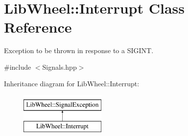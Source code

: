 \hypertarget{classLibWheel_1_1Interrupt}{
\section{\-Lib\-Wheel\-:\-:\-Interrupt \-Class \-Reference}
\label{classLibWheel_1_1Interrupt}
}


\-Exception to be thrown in response to a \-S\-I\-G\-I\-N\-T.  




{\ttfamily \#include $<$\-Signals.\-hpp$>$}

\-Inheritance diagram for \-Lib\-Wheel\-:\-:\-Interrupt\-:\begin{figure}[H]
\begin{center}
\leavevmode
\includegraphics[height=2.000000cm]{classLibWheel_1_1Interrupt}
\end{center}
\end{figure}
